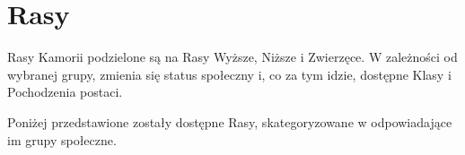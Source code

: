 \chapter{Rasy}
\label{ch:race}

Rasy Kamorii podzielone są na Rasy Wyższe, Niższe i Zwierzęce. W zależności od
wybranej grupy, zmienia się status społeczny i, co za tym idzie, dostępne Klasy
i Pochodzenia postaci.

Poniżej przedstawione zostały dostępne Rasy, skategoryzowane w odpowiadające im
grupy społeczne.


